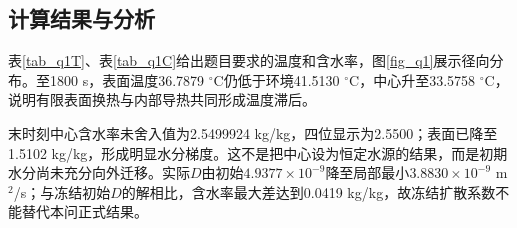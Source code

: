 \subsection{计算结果与分析}
表\ref{tab_q1T}、表\ref{tab_q1C}给出题目要求的温度和含水率，图\ref{fig_q1}展示径向分布。至1800 s，表面温度36.7879 $^\circ$C仍低于环境41.5130 $^\circ$C，中心升至33.5758 $^\circ$C，说明有限表面换热与内部导热共同形成温度滞后。



末时刻中心含水率未舍入值为2.5499924 kg/kg，四位显示为2.5500；表面已降至1.5102 kg/kg，形成明显水分梯度。这不是把中心设为恒定水源的结果，而是初期水分尚未充分向外迁移。实际$D$由初始$4.9377\times10^{-9}$降至局部最小$3.8830\times10^{-9}$ m$^2$/s；与冻结初始$D$的解相比，含水率最大差达到0.0419 kg/kg，故冻结扩散系数不能替代本问正式结果。
\FloatBarrier
